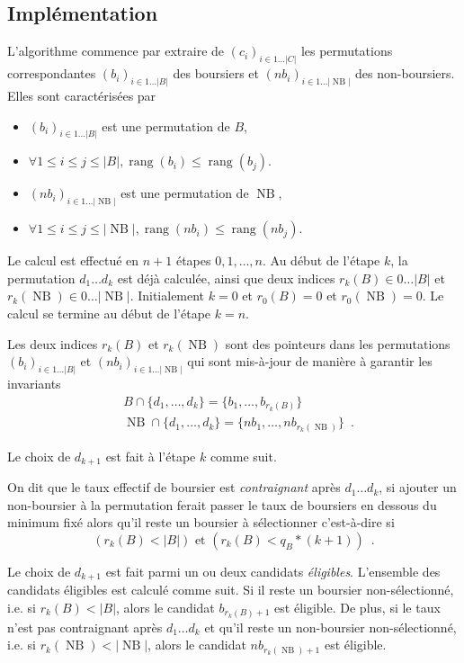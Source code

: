 \documentclass{article}
\DeclareMathOperator{\rang}{rang}
\DeclareMathOperator{\NB}{NB}
\begin{document}
\subsection{Implémentation}

L'algorithme commence par extraire de  $(c_i)_{i\in 1\ldots |C|}$ les
permutations correspondantes $(b_i)_{i\in 1\ldots |B|}$ des boursiers
et $(nb_i)_{i\in 1\ldots |\NB|}$ des non-boursiers.
Elles sont caractérisées par
\begin{itemize}
\item
$(b_i)_{i\in 1\ldots |B|}$ est une permutation de $B$,
\item
$\forall 1 \leq i \leq j \leq |B|, \rang(b_i) \leq \rang(b_j)$.
\item
$(nb_i)_{i\in 1\ldots |\NB|}$ est une permutation de $\NB$,
\item
$\forall 1 \leq i \leq j \leq |\NB|, \rang(nb_i) \leq \rang(nb_j)$.
\end{itemize}

Le calcul est effectué en $n+1$
 étapes $0,1,\ldots ,n$.
 Au début de l'étape $k$, 
 la permutation $d_1\ldots d_{k}$
 est déjà calculée, ainsi que deux indices $r_k(B) \in 0\ldots |B|$
 et $r_k(\NB) \in 0\ldots |\NB|$.
 Initialement $k=0$ et $r_0(B)=0$ et $r_0(\NB)=0$.
 Le calcul se termine au début de l'étape $k=n$.
 
 Les deux indices $r_k(B)$ et $r_k(\NB)$ sont des pointeurs dans les
 permutations $(b_i)_{i\in 1\ldots |B|}$
 et $(nb_i)_{i\in 1\ldots |\NB|}$
 qui sont mis-à-jour de manière à garantir les invariants
 \begin{align*}
&B\cap \{d_1,\ldots,d_k\}=\{b_1,\ldots, b_{r_k(B)}\}\\
&\NB\cap \{d_1,\ldots,d_k\}=\{nb_1,\ldots, nb_{r_k(\NB)}\}\enspace.
 \end{align*}
 
\medskip

Le choix de $d_{k+1}$ est fait à l'étape $k$ comme suit.

On dit que
le taux effectif de boursier est \emph{contraignant}
après $d_1\ldots d_{k}$, si ajouter
un non-boursier à la permutation ferait passer le taux de boursiers
en dessous du  minimum fixé alors qu'il reste un boursier
à sélectionner c'est-à-dire si 
\[
(r_k(B) < |B|) \text{ et } (r_k(B) < q_B * (k+1))\enspace.
\]

Le choix de $d_{k+1}$ est fait parmi un ou deux candidats \emph{éligibles}.
L'ensemble des candidats éligibles est calculé comme suit.
Si il reste un boursier non-sélectionné, i.e. si $r_k(B) < |B|$, alors le candidat $b_{r_k(B) + 1}$ est éligible.
De plus, si le taux n'est pas contraignant après $d_1\ldots d_{k}$
et qu'il reste un non-boursier non-sélectionné, i.e. si $r_k(\NB) < |\NB|$, alors le candidat $nb_{r_k(\NB) + 1}$ est éligible.
\end{document}
